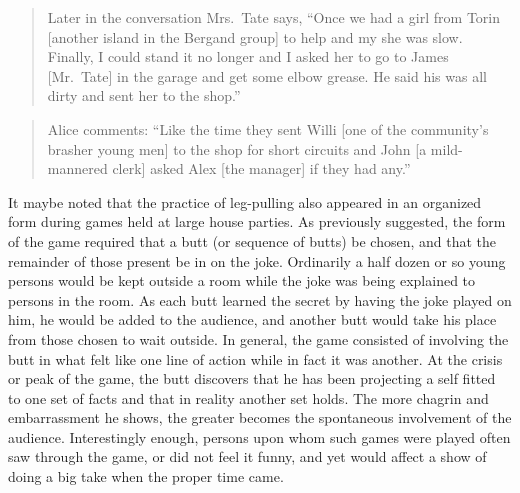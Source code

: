 \documentclass[openany,nobib]{tufte-book}
\begin{document}
\begin{quote}
Later in the conversation Mrs.~Tate says, ``Once we had a girl from
Torin {[}another island in the Bergand group{]} to help and my she was
slow. Finally, I could stand it no longer and I asked her to go to James
{[}Mr.~Tate{]} in the garage and get some elbow grease. He said his was
all dirty and sent her to the shop.''
\end{quote}

\begin{quote}
Alice comments: ``Like the time they sent Willi {[}one of the
community's brasher young men{]} to the shop for short circuits and John
{[}a mild-mannered clerk{]} asked Alex {[}the manager{]} if they had
any.''
\end{quote}

It maybe noted that the practice of leg-pulling also appeared in an
organized form during games held at large house parties. As previously
suggested, the form of the game required that a butt (or sequence of
butts) be chosen, and that the remainder of those present be in on the
joke. Ordinarily a half dozen or so young persons would be kept outside
a room while the joke was being explained to persons in the room. As
each butt learned the secret by having the joke played on him, he would
be added to the audience, and another butt would take his place from
those chosen to wait outside. In general, the game consisted of
involving the butt in what felt like one line of action while in fact it
was another. At the crisis or peak of the game, the butt discovers that
he has been projecting a self fitted to one set of facts and that in
reality another set holds. The more chagrin and embarrassment he shows,
the greater becomes the spontaneous involvement of the audience.
Interestingly enough, persons upon whom such games were played often saw
through the game, or did not feel it funny, and yet would affect a show
of doing a big take when the proper time came.
\end{document}
